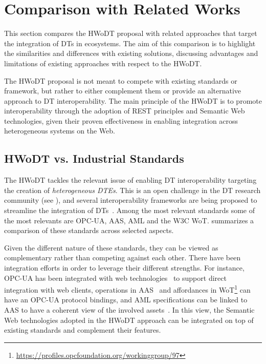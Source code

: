 \section{Comparison with Related Works}

This section compares the \ac{HWoDT} proposal with related approaches that target the integration of \acp{DT} in ecosystems. 
%
The aim of this comparison is to highlight the similarities and differences with existing solutions, discussing advantages and limitations of existing approaches with respect to the \ac{HWoDT}.

The \ac{HWoDT} proposal is not meant to compete with existing standards or framework, but rather to either complement them or provide an alternative approach to \ac{DT} interoperability.
%
The main principle of the \ac{HWoDT} is to promote interoperability through the adoption of \ac{REST} principles and Semantic Web technologies, given their proven effectiveness in enabling integration across heterogeneous systems on the Web.


\subsection{HWoDT vs. Industrial Standards}

The \ac{HWoDT} tackles the relevant issue of enabling \ac{DT} interoperability targeting the creation of \emph{heterogeneous \acp{DTE}}.
%
This is an open challenge in the \ac{DT} research community (see ), and several interoperability frameworks are being proposed to streamline the integration of \acp{DT}~\cite{Barnard_2024}.
%
Among the most relevant standards some of the most relevants are \ac{OPC-UA}, \ac{AAS}, \ac{AML} and the \ac{W3C} \ac{WoT}.  summarizes a comparison of these standards across selected aspects.

Given the different nature of these standards, they can be viewed as complementary rather than competing against each other.
%
There have been integration efforts in order to leverage their different strengths. For instance, \ac{OPC-UA} has been integrated with web technologies~\cite{DBLP:journals/csi/CavalieriSS19} to support direct integration with web clients, operations in \ac{AAS}~\cite{platform_i40_aas_part1_v2} and affordances in \ac{WoT}\footnote{\url{https://profiles.opcfoundation.org/workinggroup/97}} can have an \ac{OPC-UA} protocol bindings, and \ac{AML} specifications can be linked to \ac{AAS} to have a coherent view of the involved assets~\cite{DBLP:conf/etfa/DrathRH19,DBLP:conf/indin/WengerZ018}.
%
In this view, the Semantic Web technologies adopted in the \ac{HWoDT} approach can be integrated on top of existing standards and complement their features.

